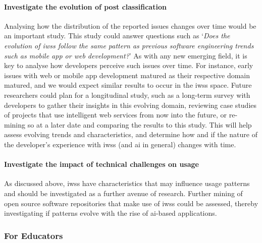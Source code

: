 \paragraph{Investigate the evolution of post classification} Analysing how the distribution of the reported issues changes over time would be an important study. This study could answer questions such as `\textit{Does the evolution of \glspl{iws} follow the same pattern as previous software engineering trends such as mobile app or web development?}' As with any new emerging field, it is key to analyse how developers perceive such issues over time. For instance, early issues with web or mobile app development matured as their respective domain matured, and we would expect similar results to occur in the \glspl{iws} space. Future researchers could plan for a longitudinal study, such as a long-term survey with developers to gather their insights in this evolving domain, reviewing case studies of projects that use intelligent web services from now into the future, or re-mining \gls{so} at a later date and comparing the results to this study. This will help assess evolving trends and characteristics, and determine how and if the nature of the developer's experience with \glspl{iws} (and \gls{ai} in general) changes with time.

\paragraph{Investigate the impact of technical challenges on  usage} As discussed above, \glspl{iws} have characteristics that may influence  usage patterns and should be investigated as a further avenue of research. Further mining of open source software repositories that make use of \glspl{iws} could be assessed, thereby investigating if  patterns evolve with the rise of \gls{ai}-based applications.

%

\subsubsection{For Educators}
\label{icse2020:sssec:educators}

